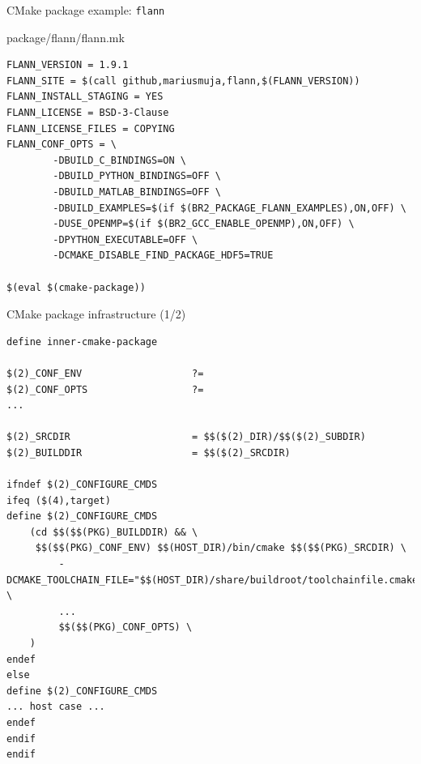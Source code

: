\begin{frame}[fragile]{CMake package example: {\tt flann}}

\begin{block}{package/flann/flann.mk}
\begin{verbatim}
FLANN_VERSION = 1.9.1
FLANN_SITE = $(call github,mariusmuja,flann,$(FLANN_VERSION))
FLANN_INSTALL_STAGING = YES
FLANN_LICENSE = BSD-3-Clause
FLANN_LICENSE_FILES = COPYING
FLANN_CONF_OPTS = \
        -DBUILD_C_BINDINGS=ON \
        -DBUILD_PYTHON_BINDINGS=OFF \
        -DBUILD_MATLAB_BINDINGS=OFF \
        -DBUILD_EXAMPLES=$(if $(BR2_PACKAGE_FLANN_EXAMPLES),ON,OFF) \
        -DUSE_OPENMP=$(if $(BR2_GCC_ENABLE_OPENMP),ON,OFF) \
        -DPYTHON_EXECUTABLE=OFF \
        -DCMAKE_DISABLE_FIND_PACKAGE_HDF5=TRUE

$(eval $(cmake-package))
\end{verbatim}
\end{block}

\end{frame}

\begin{frame}[fragile]{CMake package infrastructure (1/2)}

\begin{block}{}
\begin{verbatim}
define inner-cmake-package

$(2)_CONF_ENV                   ?=
$(2)_CONF_OPTS                  ?=
...

$(2)_SRCDIR                     = $$($(2)_DIR)/$$($(2)_SUBDIR)
$(2)_BUILDDIR                   = $$($(2)_SRCDIR)

ifndef $(2)_CONFIGURE_CMDS
ifeq ($(4),target)
define $(2)_CONFIGURE_CMDS
    (cd $$($$(PKG)_BUILDDIR) && \
     $$($$(PKG)_CONF_ENV) $$(HOST_DIR)/bin/cmake $$($$(PKG)_SRCDIR) \
         -DCMAKE_TOOLCHAIN_FILE="$$(HOST_DIR)/share/buildroot/toolchainfile.cmake" \
         ...
         $$($$(PKG)_CONF_OPTS) \
    )
endef
else
define $(2)_CONFIGURE_CMDS
... host case ...
endef
endif
endif
\end{verbatim}
\end{block}

\end{frame}

